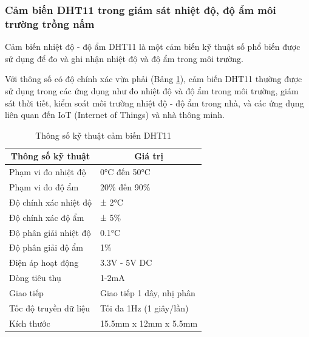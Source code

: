 \subsubsection{Cảm biến DHT11 trong giám sát nhiệt độ, độ ẩm môi trường trồng nấm}

Cảm biến nhiệt độ - độ ẩm DHT11 là một cảm biến kỹ thuật số phổ biến được sử dụng để đo và ghi nhận nhiệt độ và độ ẩm trong môi trường.

Với thông số có độ chính xác vừa phải (Bảng \ref{tab:dht11-specs}), cảm biến DHT11 thường được sử dụng trong các ứng dụng như đo nhiệt độ và độ ẩm trong môi trường, giám sát thời tiết, kiểm soát môi trường nhiệt độ - độ ẩm trong nhà, và các ứng dụng liên quan đến IoT (Internet of Things) và nhà thông minh.

\begin{table}[]
\centering
\caption{Thông số kỹ thuật cảm biến DHT11}
\label{tab:dht11-specs}
\begin{tabular}{|l|l|}
\hline
\multicolumn{1}{|c|}{\textbf{Thông số kỹ thuật}} & \multicolumn{1}{c|}{\textbf{Giá trị}} \\ \hline
Phạm vi đo nhiệt độ                              & 0°C đến 50°C                          \\ \hline
Phạm vi đo độ ẩm                                 & 20\% đến 90\%                         \\ \hline
Độ chính xác nhiệt độ                            & ± 2°C                                 \\ \hline
Độ chính xác độ ẩm                               & ± 5\%                                 \\ \hline
Độ phân giải nhiệt độ                            & 0.1°C                                 \\ \hline
Độ phân giải độ ẩm                               & 1\%                                   \\ \hline
Điện áp hoạt động                                & 3.3V - 5V DC                          \\ \hline
Dòng tiêu thụ                                    & 1-2mA                                 \\ \hline
Giao tiếp                                        & Giao tiếp 1 dây, nhị phân             \\ \hline
Tốc độ truyền dữ liệu                            & Tối đa 1Hz (1 giây/lần)               \\ \hline
Kích thước                                       & 15.5mm x 12mm x 5.5mm                 \\ \hline
\end{tabular}
\end{table}

